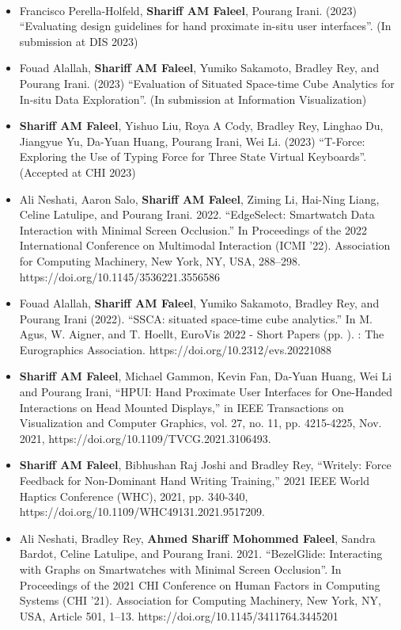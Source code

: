 \documentclass[a4paper,9.5pt]{article}
\newcommand*{\titlerulefill}[3][]{%
  \makebox[#2]{#1%
    \leaders\hrule height \dimexpr.5ex+.2pt\relax depth \dimexpr -.5ex+.2pt\relax \hfill%
    \enskip{#3}\enskip%
    \leaders\hrule height \dimexpr.5ex+.2pt\relax depth \dimexpr -.5ex+.2pt\relax \hfill\kern0pt}%
}
\newcommand{\sectiontitle}[1]{{\hfill\titlerulefill{0.7\textwidth}{\large #1}\hfill}\vspace{-0.5cm}}
\begin{document}
\vspace{0.3cm}
\sectiontitle{Publications}
\vspace{0.1cm}\\
\begin{itemize}
  \item[]Francisco Perella-Holfeld, \textbf{Shariff AM Faleel}, Pourang Irani. (2023) ``Evaluating design guidelines for hand proximate in-situ user interfaces''. (In submission at DIS 2023)
  \item[]Fouad Alallah, \textbf{Shariff AM Faleel}, Yumiko Sakamoto, Bradley Rey, and Pourang Irani. (2023) ``Evaluation of Situated Space-time Cube Analytics for In-situ Data Exploration''. (In submission at Information Visualization)
  \item[]\textbf{Shariff AM Faleel}, Yishuo Liu, Roya A Cody, Bradley Rey, Linghao Du, Jiangyue Yu, Da-Yuan Huang, Pourang Irani, Wei Li. (2023) ``T-Force: Exploring the Use of Typing Force for Three State Virtual Keyboards''. (Accepted at CHI 2023)
  \item[]Ali Neshati, Aaron Salo, \textbf{Shariff AM Faleel}, Ziming Li, Hai-Ning Liang, Celine Latulipe, and Pourang Irani. 2022. ``EdgeSelect: Smartwatch Data Interaction with Minimal Screen Occlusion.'' In Proceedings of the 2022 International Conference on Multimodal Interaction (ICMI '22). Association for Computing Machinery, New York, NY, USA, 288–298. https://doi.org/10.1145/3536221.3556586
  \item[]Fouad Alallah, \textbf{Shariff AM Faleel}, Yumiko Sakamoto, Bradley Rey, and Pourang Irani (2022). ``SSCA: situated space-time cube analytics.'' In M. Agus, W. Aigner, and T. Hoellt, EuroVis 2022 - Short Papers (pp. ). : The Eurographics Association. https://doi.org/10.2312/evs.20221088
  \item[]\textbf{Shariff AM Faleel}, Michael Gammon, Kevin Fan, Da-Yuan Huang, Wei Li and Pourang Irani, ``HPUI: Hand Proximate User Interfaces for One-Handed Interactions on Head Mounted Displays,'' in IEEE Transactions on Visualization and Computer Graphics, vol. 27, no. 11, pp. 4215-4225, Nov. 2021, https://doi.org/10.1109/TVCG.2021.3106493.
  \item[]\textbf{Shariff AM Faleel}, Bibhushan Raj Joshi and Bradley Rey, ``Writely: Force Feedback for Non-Dominant Hand Writing Training,'' 2021 IEEE World Haptics Conference (WHC), 2021, pp. 340-340, https://doi.org/10.1109/WHC49131.2021.9517209.
  \item[]Ali Neshati, Bradley Rey, \textbf{Ahmed Shariff Mohommed Faleel}, Sandra Bardot, Celine Latulipe, and Pourang Irani. 2021. ``BezelGlide: Interacting with Graphs on Smartwatches with Minimal Screen Occlusion''. In Proceedings of the 2021 CHI Conference on Human Factors in Computing Systems (CHI '21). Association for Computing Machinery, New York, NY, USA, Article 501, 1–13. https://doi.org/10.1145/3411764.3445201

\end{itemize}
\end{document}
